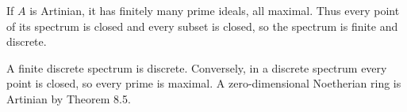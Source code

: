 If $A$ is Artinian, it has finitely many prime ideals, all maximal. Thus every point of its spectrum is closed and every subset is closed, so the spectrum is finite and discrete.

A finite discrete spectrum is discrete. Conversely, in a discrete spectrum every point is closed, so every prime is maximal. A zero-dimensional Noetherian ring is Artinian by Theorem 8.5.
